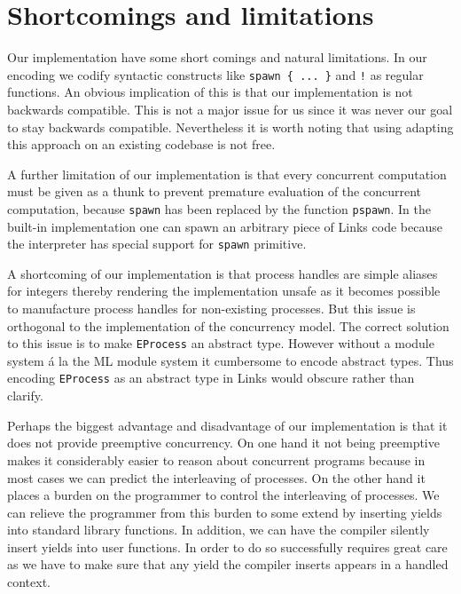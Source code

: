 \documentclass[12pt,mscres,cdtppar,twoside,openright,logo,rightchapter,normalheadings]{infthesis}
\theoremstyle{definition}
\newcommand{\todo}[1]{{\par\noindent\small\color{red} \framebox{\parbox{\dimexpr\linewidth-2\fboxsep-2\fboxrule}{\textbf{TODO:} #1}}}}
\begin{document}
\section{Shortcomings and limitations}
\label{sec:limitations}

Our implementation have some short comings and natural limitations. 
%
In our encoding we codify syntactic constructs like
\lstinline$spawn { ... }$ and \lstinline$!$ as regular functions. An
obvious implication of this is that our implementation is not
backwards compatible. This is not a major issue for us since it was
never our goal to stay backwards compatible. Nevertheless it is worth
noting that using adapting this approach on an existing codebase is
not free.

A further limitation of our implementation is that every concurrent
computation must be given as a thunk to prevent premature evaluation
of the concurrent computation, because \lstinline$spawn$ has been
replaced by the function \lstinline$pspawn$. In the built-in
implementation one can spawn an arbitrary piece of Links code because
the interpreter has special support for \lstinline$spawn$ primitive.

A shortcoming of our implementation is that process handles are simple
aliases for integers thereby rendering the implementation unsafe as it
becomes possible to manufacture process handles for non-existing
processes. But this issue is orthogonal to the implementation of the
concurrency model. The correct solution to this issue is to make
\lstinline$EProcess$ an abstract type. However without a module system
á la the ML module system it cumbersome to encode abstract types. Thus
encoding \lstinline$EProcess$ as an abstract type in Links would
obscure rather than clarify.

\todo{Heterogeneous mailboxes}

Perhaps the biggest advantage and disadvantage of our implementation
is that it does not provide preemptive concurrency. On one hand it not
being preemptive makes it considerably easier to reason about
concurrent programs because in most cases we can predict the
interleaving of processes. On the other hand it places a burden on the
programmer to control the interleaving of processes. We can relieve
the programmer from this burden to some extend by inserting yields
into standard library functions. In addition, we can have the
compiler silently insert yields into user functions. In order to do so
successfully requires great care as we have to make sure that any
yield the compiler inserts appears in a handled context.
\end{document}

